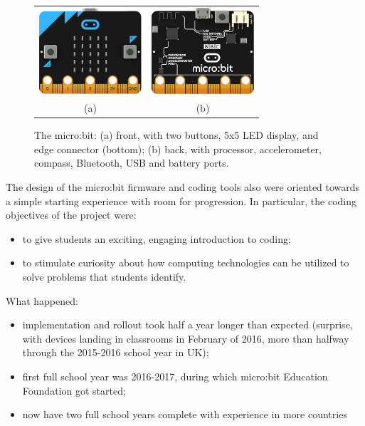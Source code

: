 \begin{figure} 
\begin{tabular}{cc}
  \includegraphics[width=1.5in]{images/microbit-front.png} &
  \includegraphics[width=1.5in]{images/microbit-back.png} \\
  (a) & (b) 
\end{tabular}
\caption{\label{fig:microbit}The micro:bit: (a) front, with two buttons, 
  5x5 LED display, and edge connector (bottom); (b) back, with processor, accelerometer, compass, Bluetooth, USB and battery ports.}
\end{figure}


The design of the micro:bit firmware and coding tools also were oriented towards a 
simple starting experience with room for progression. In particular, the coding 
objectives of the project were:
\begin{itemize}
  \item to give students an exciting, engaging introduction to coding;
  \item to stimulate curiosity about how computing technologies can be utilized 
  to solve problems that students identify. 
\end{itemize}

%

What happened:
\begin{itemize}
\item implementation and rollout took half a year longer than expected (surprise, with devices landing
in classrooms in February of 2016, more than halfway through the 2015-2016 school year in UK);
\item first full school year was 2016-2017, during which micro:bit Education Foundation got
started; 
\item now have two full school years complete with experience in more countries 
\end{itemize}

